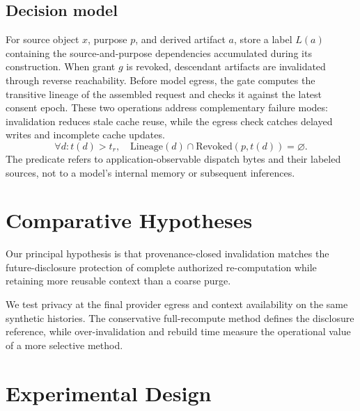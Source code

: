 \documentclass[11pt,a4paper]{article}
\begin{document}
\subsection{Decision model}
For source object $x$, purpose $p$, and derived artifact $a$, store a label $L(a)$ containing the source-and-purpose dependencies accumulated during its construction. When grant $g$ is revoked, descendant artifacts are invalidated through reverse reachability. Before model egress, the gate computes the transitive lineage of the assembled request and checks it against the latest consent epoch. These two operations address complementary failure modes: invalidation reduces stale cache reuse, while the egress check catches delayed writes and incomplete cache updates.
\begin{equation}
\forall d:t(d)>t_r,\quad
\mathrm{Lineage}(d)\cap\mathrm{Revoked}(p,t(d))=\varnothing.
\end{equation}
The predicate refers to application-observable dispatch bytes and their labeled sources, not to a model's internal memory or subsequent inferences.

\section{Comparative Hypotheses}
Our principal hypothesis is that provenance-closed invalidation matches the future-disclosure protection of complete authorized re-computation while retaining more reusable context than a coarse purge.

We test privacy at the final provider egress and context availability on the same synthetic histories. The conservative full-recompute method defines the disclosure reference, while over-invalidation and rebuild time measure the operational value of a more selective method.

\section{Experimental Design}
\end{document}
